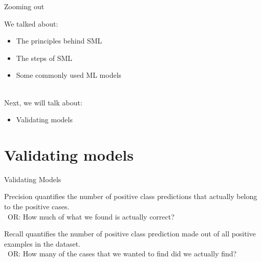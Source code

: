 \documentclass[handout]{beamer}
\begin{document}
\begin{frame}{Zooming out} 
	
	We talked about:
	\begin{itemize}
		\item The principles behind SML
		\item The steps of SML
		\item Some commonly used ML models \\\
	\end{itemize}
	
	Next, we will talk about:
	\begin{itemize}
		\item Validating models
	\end{itemize}
	
\end{frame}


\section{Validating models}


\begin{frame}{Validating Models}
	
	Precision quantifies the number of positive class predictions that actually belong to the positive cases. \\\ 
	OR: How much of what we found is actually correct?
	
	Recall quantifies the number of positive class prediction made out of all positive examples in the dataset. \\\
	OR: How many of the cases that we wanted to find did we actually find?




\end{frame}
	
\end{document}
